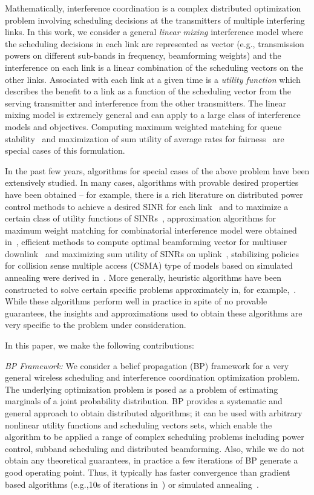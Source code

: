 \documentclass[letterpaper,twocolumn,twoside]{IEEEtran}
\begin{document}
Mathematically, interference coordination is a complex distributed
optimization problem involving scheduling decisions at the
transmitters of multiple interfering links.
In this work, we consider a general \emph{linear mixing}
interference model where the scheduling decisions
in each link are represented as vector (e.g., transmission
powers on different sub-bands in frequency, beamforming weights) and
the interference on each link is a linear
combination of the scheduling vectors on the other links.
Associated with each link at a given time is a \emph{utility function} which
describes the benefit to a link as a function of the scheduling
vector from the serving transmitter and interference from the other
transmitters.  The linear mixing model is extremely general
and can apply to a large class of interference models and objectives.
Computing maximum weighted matching for queue
stability~\cite{TassiulasE:92} and maximization of sum utility of
average rates for fairness~\cite{stolyar_2005} are special cases of
this formulation.

In the past few years, algorithms for special cases of the above
problem have been extensively studied. In many cases, algorithms
with provable desired properties have been obtained -- for example,
there is a rich literature on distributed power control methods to
achieve a desired SINR for each link~\cite{chiang_2008} and to
maximize a certain class of utility functions of
SINRs~\cite{huang_2006}, approximation algorithms for maximum weight
matching for combinatorial interference model were obtained
in~\cite{sharma_2007, gupta_2007}, efficient methods to compute
optimal beamforming vector for multiuser downlink~\cite{TanCS:2010}
and maximizing sum utility of SINRs on uplink~\cite{tan_isit},
stabilizing policies for collision sense multiple access (CSMA) type
of models based on simulated annealing were derived
in~\cite{rajagopalan_2009}. More generally, heuristic algorithms
have been constructed to solve certain specific problems
approximately in, for example,~\cite{StolyarVis:2009,madan_2010}.
While these algorithms perform well in practice in spite of no
provable guarantees, the insights and approximations used to obtain
these algorithms are very specific to the problem under
consideration.

In this paper, we make the following contributions:

\noindent\emph{BP Framework:} We consider a belief propagation (BP)
framework for a very
general wireless scheduling and interference coordination
optimization problem. The underlying optimization problem is posed
as a problem of estimating marginals of a joint probability
distribution. BP provides a systematic and general approach to
obtain distributed algorithms; it can be used with arbitrary
nonlinear utility functions and scheduling vectors sets, which
enable the algorithm to be applied a range of complex scheduling
problems including power control, subband scheduling and distributed
beamforming.
Also, while we do not obtain any theoretical guarantees, in
practice a few iterations of BP generate a good operating point.
Thus, it typically has faster convergence than gradient based
algorithms (e.g.,10s of iterations in~\cite{tan_isit}) or simulated
annealing~\cite{Hajek:88}.
\end{document}
